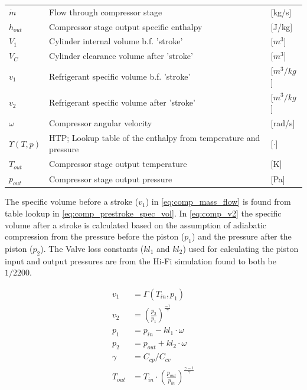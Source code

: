 \begin{center}
	\begin{tabular}{l p{8cm} l}
		$\dot{m}$  & Flow through compressor stage                                   & [\si{kg}/\si{s}]     \\
		$h_{out}$  & Compressor stage output specific enthalpy                       & [\si{J}/\si{kg}]     \\
		$V_1$      & Cylinder internal volume b.f. 'stroke'                          & [$\si{m}^3$]         \\
		$V_C$      & Cylinder clearance volume after 'stroke'                        & [$\si{m}^3$]         \\
		$v_1$      & Refrigerant specific volume b.f. 'stroke'                       & [$\si{m}^3/\si{kg}$] \\
		$v_2$      & Refrigerant specific volume after 'stroke'                      & [$\si{m}^3/\si{kg}$] \\
		$\omega$   & Compressor angular velocity                                     & [\si{rad}/\si{s}]    \\
		$\Upsilon(T,p)$ & HTP; Lookup table of the enthalpy from temperature and pressure & [$\cdot]$            \\
		$T_{out}$  & Compressor stage output temperature                             & [\si{K}]             \\
		$p_{out}$  & Compressor stage output pressure                                & [\si{Pa}]
	\end{tabular}
\end{center}

The specific volume before a stroke ($v_1$) in \cref{eq:comp_mass_flow} is found from table lookup in \cref{eq:comp_prestroke_spec_vol}. In \cref{eq:comp_v2} the specific volume after a stroke is calculated based on the assumption of adiabatic compression from the pressure before the piston ($p_1$) and the pressure after the piston ($p_2$). The Valve loss constants ($kl_1$ and $kl_2$) used for calculating the piston input and output pressures are from the Hi-Fi simulation found to both be $1/2200$.

\begin{align}
	v_1     & = \Gamma(T_{in},p_{1}) \label{eq:comp_prestroke_spec_vol}                   \\
	v_2     & = \left(\frac{p_2}{p_1}\right)^{\frac{-1}{\gamma}} \label{eq:comp_v2}                         \\
	p_1     & = p_{in} - kl_1 \cdot \omega \label{eq:comp_p1}                                               \\
	p_2     & = p_{out} + kl_2 \cdot \omega \label{eq:comp_p2}                                              \\
	\gamma  & = C_{cp}/C_{cv} \label{eq:comp_gamma}                                                            \\
	T_{out} & = T_{in}\cdot \left(\frac{p_{out}}{p_{in}}\right)^{\frac{\gamma-1}{\gamma}} \label{eq:comp_Tout}
\end{align}

